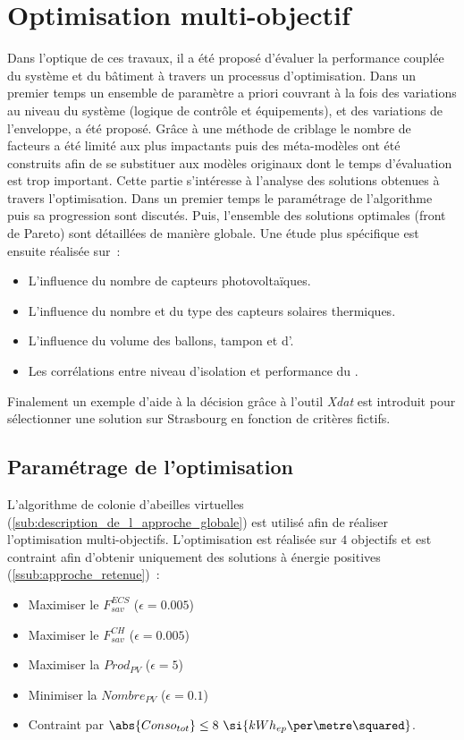 \section{Optimisation multi-objectif} %
\label{sec:optimisation_multi_objectif}
Dans l’optique de ces travaux, il a été proposé d’évaluer la performance couplée
du système et du bâtiment à travers un processus d’optimisation. Dans un premier temps
un ensemble de paramètre a priori couvrant à la fois des variations
au niveau du système (logique de contrôle et équipements), et des variations de l’enveloppe,
a été proposé. Grâce à une méthode de criblage le nombre de facteurs a été limité
aux plus impactants puis des méta-modèles ont été construits afin de se substituer
aux modèles originaux dont le temps d’évaluation est trop important.
Cette partie s’intéresse à l’analyse des solutions obtenues à travers l’optimisation.
Dans un premier temps le paramétrage de l’algorithme puis sa progression sont discutés.
Puis, l’ensemble des solutions optimales (front de Pareto) sont détaillées de manière globale. Une étude
plus spécifique est ensuite réalisée sur~:
\begin{itemize}
  \item L’influence du nombre de capteurs photovoltaïques.
  \item L’influence du nombre et du type des capteurs solaires thermiques.
  \item L’influence du volume des ballons, tampon et d’.
  \item Les corrélations entre niveau d’isolation et performance du .
\end{itemize}
Finalement un exemple d’aide à la décision grâce à l’outil \textit{Xdat} est introduit
pour sélectionner une solution sur Strasbourg en fonction de critères fictifs.



\subsection{Paramétrage de l’optimisation} %
\label{sub:parametrage_de_l_optimisation}
L’algorithme de colonie d’abeilles virtuelles (\ref{sub:description_de_l_approche_globale})
est utilisé afin de réaliser l’optimisation multi-objectifs. L’optimisation est réalisée
sur $4$ objectifs et est contraint afin d’obtenir uniquement des solutions à énergie
positives (\ref{ssub:approche_retenue})~:
\begin{itemize}
  \item Maximiser le $F_{sav}^{ECS}$ ($\epsilon = 0.005$)
  \item Maximiser le $F_{sav}^{CH}$ ($\epsilon = 0.005$)
  \item Maximiser la $Prod_{PV}$ ($\epsilon = 5$)
  \item Minimiser la $Nombre_{PV}$ ($\epsilon = 0.1$)
  \item Contraint par $\abs{Conso_{tot}}   \leq  8 \ \si{kWh_{ep}\per\metre\squared}$.
\end{itemize}

